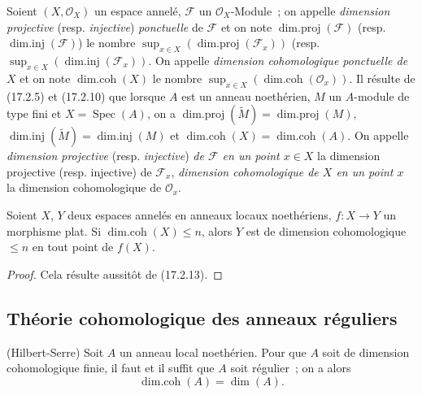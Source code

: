\begin{env}[17.2.14]
\label{0.17.2.14-fr}
Soient $(X,\mathscr{O}_X)$ un espace annelé, $\mathscr{F}$ un
$\mathscr{O}_X$-Module~; on appelle \emph{dimension projective} (resp.
\emph{injective}) \emph{ponctuelle} de $\mathscr{F}$ et on note
$\operatorname{dim.proj}(\mathscr{F})$ (resp.
$\operatorname{dim.inj}(\mathscr{F})$) le nombre
$\sup_{x\in X}(\operatorname{dim.proj}(\mathscr{F}_x))$ (resp.
$\sup_{x\in X}(\operatorname{dim.inj}(\mathscr{F}_x))$. On appelle
\emph{dimension cohomologique ponctuelle de $X$} et on note
$\operatorname{dim.coh}(X)$ le nombre
$\sup_{x\in X}(\operatorname{dim.coh}(\mathscr{O}_x))$. Il résulte de
(17.2.5) et (17.2.10) que lorsque $A$ est un anneau noethérien, $M$ un
$A$-module de type fini et $X=\operatorname{Spec}(A)$, on a
$\operatorname{dim.proj}(\widetilde{M})=\operatorname{dim.proj}(M)$,
$\operatorname{dim.inj}(\widetilde{M})=\operatorname{dim.inj}(M)$ et
$\operatorname{dim.coh}(X)=\operatorname{dim.coh}(A)$. On appelle
\emph{dimension projective} (resp. \emph{injective}) \emph{de $\mathscr{F}$ en
un point $x\in X$} la dimension projective (resp. injective) de
$\mathscr{F}_x$, \emph{dimension cohomologique de $X$ en un point $x$} la
dimension cohomologique de $\mathscr{O}_x$.
\end{env}

\begin{proposition}[17.2.15]
\label{0.17.2.15-fr}
Soient $X$, $Y$ deux espaces annelés en anneaux locaux noethériens,
$f:X\longrightarrow Y$ un morphisme plat. Si
$\operatorname{dim.coh}(X)\leq n$, alors $Y$ est de dimension cohomologique
$\leq n$ en tout point de $f(X)$.
\end{proposition}

\begin{proof}
Cela résulte aussitôt de (17.2.13).
\end{proof}

\subsection{Théorie cohomologique des anneaux réguliers}
\label{subsection:0.17.3-fr}

\begin{theorem}[17.3.1]
\label{0.17.3.1-fr}
\textnormal{(Hilbert-Serre)} Soit $A$ un anneau local noethérien. Pour que $A$
soit de dimension cohomologique finie, il faut et il suffit que $A$ soit
régulier~; on a alors
\begin{equation}
\label{0.17.3.1.1-fr}
\tag{17.3.1.1}
  \operatorname{dim.coh}(A)=\dim(A).
\end{equation}
\end{theorem}

